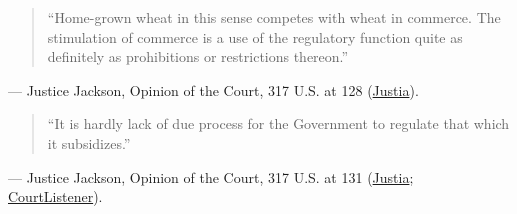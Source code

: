 \documentclass[12pt]{article}
\begin{document}
\begin{quote}
``Home-grown wheat in this sense competes with wheat in commerce. The stimulation of commerce is a use of the regulatory function quite as definitely as prohibitions or restrictions thereon.''
\end{quote}
\noindent --- Justice Jackson, Opinion of the Court, 317 U.S. at 128 (\href{https://supreme.justia.com/cases/federal/us/317/111/}{Justia}).

\begin{quote}
``It is hardly lack of due process for the Government to regulate that which it subsidizes.''
\end{quote}
\noindent --- Justice Jackson, Opinion of the Court, 317 U.S. at 131 (\href{https://supreme.justia.com/cases/federal/us/317/111/}{Justia}; \href{https://www.courtlistener.com/opinion/103716/wickard-v-filburn/}{CourtListener}).
\end{document}
